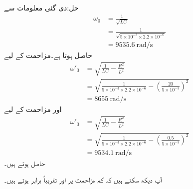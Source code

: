 حل:دی گئی معلومات سے
\begin{align*}
\omega_0&=\frac{1}{\sqrt{LC}}\\
&=\frac{1}{\sqrt{5\times 10^{-3} \times 2.2 \times 10^{-6}}}\\
&=\SI{9535.6}{\radian\per\second}
\end{align*}
حاصل ہوتا ہے۔مزاحمت  کے لیے
\begin{align*}
\omega'_0&=\sqrt{\frac{1}{LC}-\frac{R^2}{L^2}}\\
&=\sqrt{\frac{1}{5\times 10^{-3}\times 2.2 \times 10^{-6}} -\left(\frac{20}{5\times 10^{-3}}\right)^2}\\
&=\SI{8655}{\radian\per\second}
\end{align*}
اور مزاحمت  کے لیے
\begin{align*}
\omega'_0&=\sqrt{\frac{1}{LC}-\frac{R^2}{L^2}}\\
&=\sqrt{\frac{1}{5\times 10^{-3}\times 2.2 \times 10^{-6}} -\left(\frac{0.5}{5\times 10^{-3}}\right)^2}\\
&=\SI{9534.1}{\radian\per\second}
\end{align*}
حاصل ہوتے ہیں۔

آپ دیکھ سکتے ہیں کہ کم مزاحمت پر  اور  تقریباً برابر ہوتے ہیں۔

